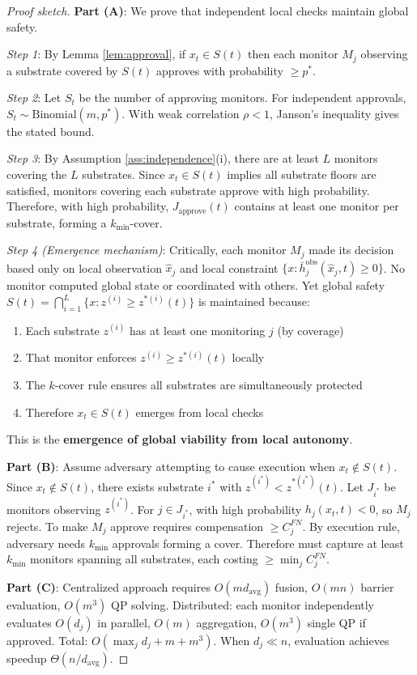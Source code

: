 \documentclass[11pt,a4paper]{article}
\theoremstyle{definition}
\begin{document}
\begin{proof}[Proof sketch]
\textbf{Part (A)}: We prove that independent local checks maintain global safety.

\emph{Step 1}: By Lemma \ref{lem:approval}, if $x_t \in S(t)$ then each monitor $M_j$ observing a substrate covered by $S(t)$ approves with probability $\geq p^*$.

\emph{Step 2}: Let $S_t$ be the number of approving monitors. For independent approvals, $S_t \sim \text{Binomial}(m, p^*)$. With weak correlation $\rho < 1$, Janson's inequality gives the stated bound.

\emph{Step 3}: By Assumption \ref{ass:independence}(i), there are at least $L$ monitors covering the $L$ substrates. Since $x_t \in S(t)$ implies all substrate floors are satisfied, monitors covering each substrate approve with high probability. Therefore, with high probability, $J_{\text{approve}}(t)$ contains at least one monitor per substrate, forming a $k_{\min}$-cover.

\emph{Step 4 (Emergence mechanism)}: Critically, each monitor $M_j$ made its decision based only on local observation $\hat{x}_j$ and local constraint $\{x : \bar{h}_j^{\text{obs}}(\hat{x}_j, t) \geq 0\}$. No monitor computed global state or coordinated with others. Yet global safety $S(t) = \bigcap_{i=1}^L\{x : z^{(i)} \geq z^{*(i)}(t)\}$ is maintained because:
\begin{enumerate}
\item Each substrate $z^{(i)}$ has at least one monitoring $j$ (by coverage)
\item That monitor enforces $z^{(i)} \geq z^{*(i)}(t)$ locally
\item The $k$-cover rule ensures all substrates are simultaneously protected
\item Therefore $x_t \in S(t)$ emerges from local checks
\end{enumerate}
This is the \textbf{emergence of global viability from local autonomy}.

\textbf{Part (B)}: Assume adversary attempting to cause execution when $x_t \notin S(t)$. Since $x_t \notin S(t)$, there exists substrate $i^*$ with $z^{(i^*)} < z^{*(i^*)}(t)$. Let $J_{i^*}$ be monitors observing $z^{(i^*)}$. For $j \in J_{i^*}$, with high probability $h_j(x_t, t) < 0$, so $M_j$ rejects. To make $M_j$ approve requires compensation $\geq C_j^{FN}$. By execution rule, adversary needs $k_{\min}$ approvals forming a cover. Therefore must capture at least $k_{\min}$ monitors spanning all substrates, each costing $\geq \min_j C_j^{FN}$.

\textbf{Part (C)}: Centralized approach requires $O(m d_{\text{avg}})$ fusion, $O(mn)$ barrier evaluation, $O(m^3)$ QP solving. Distributed: each monitor independently evaluates $O(d_j)$ in parallel, $O(m)$ aggregation, $O(m^3)$ single QP if approved. Total: $O(\max_j d_j + m + m^3)$. When $d_j \ll n$, evaluation achieves speedup $\Theta(n/d_{\text{avg}})$.
\end{proof}
\end{document}
